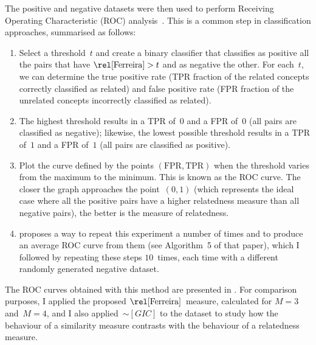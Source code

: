 The positive and negative datasets were then used to perform Receiving Operating Characteristic (ROC) analysis~\citep{Fawcett2006}. This is a common step in classification approaches, summarised as follows:
\begin{enumerate}
    \item Select a threshold~$t$ and create a binary classifier that classifies as positive all the pairs that have $\ferreira>t$ and as negative the other. For each~$t$, we can determine the true positive rate (TPR \mdash fraction of the related concepts correctly classified as related) and false positive rate (FPR \mdash fraction of the unrelated concepts incorrectly classified as related).
    \item The highest threshold results in a TPR of~$0$ and a FPR of~$0$ (all pairs are classified as negative); likewise, the lowest possible threshold results in a TPR of~$1$ and a FPR of~$1$ (all pairs are classified as positive).
    \item Plot the curve defined by the points $(\textrm{FPR}, \textrm{TPR})$ when the threshold varies from the maximum to the minimum. This is known as the ROC curve. The closer the graph approaches the point~$(0, 1)$ (which represents the ideal case where all the positive pairs have a higher relatedness measure than all negative pairs), the better is the measure of relatedness.
    \item \citet{Fawcett2004} proposes a way to repeat this experiment a number of times and to produce an average ROC curve from them (see Algorithm~5 of that paper), which I followed by repeating these steps $10$~times, each time with a different randomly generated negative dataset.
\end{enumerate}

The ROC curves obtained with this method are presented in . For comparison purposes, I applied the proposed $\ferreira$~measure, calculated for $M=3$ and~$M=4$, and I also applied~$\sim[GIC]$ to the dataset to study how the behaviour of a similarity measure contrasts with the behaviour of a relatedness measure.

